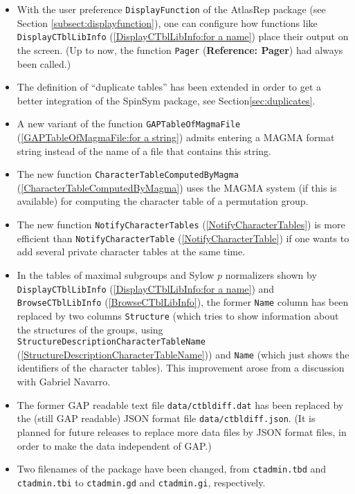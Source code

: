 \documentclass[a4paper,11pt]{report}
\begin{document}
{{{\begin{itemize}
\item  With the user preference \texttt{DisplayFunction} of the \textsf{AtlasRep} package (see Section \ref{subsect:displayfunction}), one can configure how functions like \texttt{DisplayCTblLibInfo} (\ref{DisplayCTblLibInfo:for a name}) place their output on the screen. (Up to now, the function \texttt{Pager} (\textbf{Reference: Pager}) had always been called.) 
\item  The definition of ``duplicate tables'' has been extended in order to get a better integration of the \textsf{SpinSym} package, see Section{\nobreakspace}\ref{sec:duplicates}. 
\item  A new variant of the function \texttt{GAPTableOfMagmaFile} (\ref{GAPTableOfMagmaFile:for a string}) admits entering a \textsf{MAGMA} format string instead of the name of a file that contains this string. 
\item  The new function \texttt{CharacterTableComputedByMagma} (\ref{CharacterTableComputedByMagma}) uses the \textsf{MAGMA} system (if this is available) for computing the character table of a
permutation group. 
\item  The new function \texttt{NotifyCharacterTables} (\ref{NotifyCharacterTables}) is more efficient than \texttt{NotifyCharacterTable} (\ref{NotifyCharacterTable}) if one wants to add several private character tables at the same time. 
\item  In the tables of maximal subgroups and Sylow $p$ normalizers shown by \texttt{DisplayCTblLibInfo} (\ref{DisplayCTblLibInfo:for a name}) and \texttt{BrowseCTblLibInfo} (\ref{BrowseCTblLibInfo}), the former \texttt{Name} column has been replaced by two columns \texttt{Structure} (which tries to show information about the structures of the groups, using \texttt{StructureDescriptionCharacterTableName} (\ref{StructureDescriptionCharacterTableName})) and \texttt{Name} (which just shows the identifiers of the character tables). This improvement
arose from a discussion with Gabriel Navarro. 
\item  The former \textsf{GAP} readable text file \texttt{data/ctbldiff.dat} has been replaced by the (still \textsf{GAP} readable) JSON format file \texttt{data/ctbldiff.json}. (It is planned for future releases to replace more data files by JSON format
files, in order to make the data independent of \textsf{GAP}.) 
\item  Two filenames of the package have been changed, from \texttt{ctadmin.tbd} and \texttt{ctadmin.tbi} to \texttt{ctadmin.gd} and \texttt{ctadmin.gi}, respectively. 
\end{itemize}
 

}}}
\end{document}
